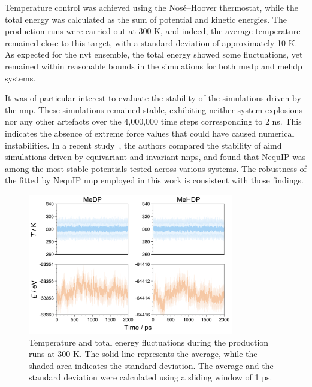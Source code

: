 Temperature control was achieved using the Nos\'e--Hoover thermostat, while the total energy was calculated as the sum of potential and kinetic energies. The production runs were carried out at 300 K, and indeed, the average temperature remained close to this target, with a standard deviation of approximately 10 K. As expected for the \ac{nvt} ensemble, the total energy showed some fluctuations, yet remained within reasonable bounds in the simulations for both \ac{medp} and \ac{mehdp} systems.

It was of particular interest to evaluate the stability of the simulations driven by the \ac{nnp}. These simulations remained stable, exhibiting neither system explosions nor any other artefacts over the 4,000,000 time steps corresponding to 2 ns. This indicates the absence of extreme force values that could have caused numerical instabilities. In a recent study~\citep{fuForcesAreNot2023}, the authors compared the stability of \ac{aimd} simulations driven by equivariant and invariant \acp{nnp}, and found that NequIP was among the most stable potentials tested across various systems. The robustness of the fitted by NequIP \ac{nnp} employed in this work is consistent with those findings.

\begin{figure}[t!]
    \centering
    \includegraphics[width=0.8\textwidth]{Figures/4_Results/results_aimd_stability.png}
    \caption{Temperature and total energy fluctuations during the production runs at 300 K. The solid line represents the average, while the shaded area indicates the standard deviation. The average and the standard deviation were calculated using a sliding window of 1 ps.}
    \label{fig:temp_energy_fluctuations}
\end{figure}



